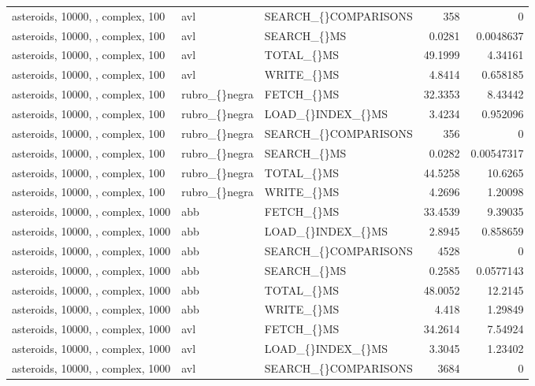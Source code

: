 \begin{longtable}{p{4cm}p{1.4cm}p{2.6cm}rr}
asteroids, 10000, , complex, 100 & avl & SEARCH\_\allowbreak\{\}COMPARISONS & 358 & 0\\
asteroids, 10000, , complex, 100 & avl & SEARCH\_\allowbreak\{\}MS & 0.0281 & 0.0048637\\
asteroids, 10000, , complex, 100 & avl & TOTAL\_\allowbreak\{\}MS & 49.1999 & 4.34161\\
asteroids, 10000, , complex, 100 & avl & WRITE\_\allowbreak\{\}MS & 4.8414 & 0.658185\\
asteroids, 10000, , complex, 100 & rubro\_\allowbreak\{\}negra & FETCH\_\allowbreak\{\}MS & 32.3353 & 8.43442\\
asteroids, 10000, , complex, 100 & rubro\_\allowbreak\{\}negra & LOAD\_\allowbreak\{\}INDEX\_\allowbreak\{\}MS & 3.4234 & 0.952096\\
asteroids, 10000, , complex, 100 & rubro\_\allowbreak\{\}negra & SEARCH\_\allowbreak\{\}COMPARISONS & 356 & 0\\
asteroids, 10000, , complex, 100 & rubro\_\allowbreak\{\}negra & SEARCH\_\allowbreak\{\}MS & 0.0282 & 0.00547317\\
asteroids, 10000, , complex, 100 & rubro\_\allowbreak\{\}negra & TOTAL\_\allowbreak\{\}MS & 44.5258 & 10.6265\\
asteroids, 10000, , complex, 100 & rubro\_\allowbreak\{\}negra & WRITE\_\allowbreak\{\}MS & 4.2696 & 1.20098\\
asteroids, 10000, , complex, 1000 & abb & FETCH\_\allowbreak\{\}MS & 33.4539 & 9.39035\\
asteroids, 10000, , complex, 1000 & abb & LOAD\_\allowbreak\{\}INDEX\_\allowbreak\{\}MS & 2.8945 & 0.858659\\
asteroids, 10000, , complex, 1000 & abb & SEARCH\_\allowbreak\{\}COMPARISONS & 4528 & 0\\
asteroids, 10000, , complex, 1000 & abb & SEARCH\_\allowbreak\{\}MS & 0.2585 & 0.0577143\\
asteroids, 10000, , complex, 1000 & abb & TOTAL\_\allowbreak\{\}MS & 48.0052 & 12.2145\\
asteroids, 10000, , complex, 1000 & abb & WRITE\_\allowbreak\{\}MS & 4.418 & 1.29849\\
asteroids, 10000, , complex, 1000 & avl & FETCH\_\allowbreak\{\}MS & 34.2614 & 7.54924\\
asteroids, 10000, , complex, 1000 & avl & LOAD\_\allowbreak\{\}INDEX\_\allowbreak\{\}MS & 3.3045 & 1.23402\\
asteroids, 10000, , complex, 1000 & avl & SEARCH\_\allowbreak\{\}COMPARISONS & 3684 & 0\\

\end{longtable}
